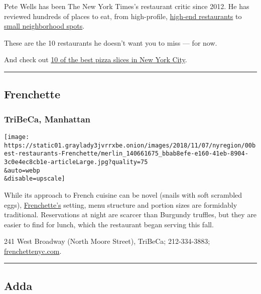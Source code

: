 Pete Wells has been The New York Times's restaurant critic since 2012.
He has reviewed hundreds of places to eat, from high-profile,
\href{https://www.nytimes3xbfgragh.onion/2018/10/09/dining/manhatta-restaurant-review.html}{high-end
restaurants} to
\href{https://www.nytimes3xbfgragh.onion/2018/10/02/dining/village-cafe-review-brooklyn.html}{small
neighborhood spots}.

These are the 10 restaurants he doesn't want you to miss --- for now.

And check out
\href{https://www.nytimes3xbfgragh.onion/2018/11/15/nyregion/best-pizza-slices-nyc.html}{10
of the best pizza slices in New York City}.

\begin{center}\rule{0.5\linewidth}{\linethickness}\end{center}

\hypertarget{frenchette}{%
\subsection{Frenchette}\label{frenchette}}

\hypertarget{tribeca-manhattan}{%
\subsubsection{TriBeCa, Manhattan}\label{tribeca-manhattan}}

\texttt{[image: https://static01.graylady3jvrrxbe.onion/images/2018/11/07/nyregion/00best-restaurants-Frenchette/merlin\_140661675\_bbab8efe-e160-41eb-8904-3c0e4ec8cb1e-articleLarge.jpg?quality=75\\\&auto=webp\\\&disable=upscale]}

While its approach to French cuisine can be novel (snails with soft
scrambled eggs),
\href{https://www.nytimes3xbfgragh.onion/2018/07/10/dining/frenchette-review-restaurant-tribeca.html}{Frenchette's}
setting, menu structure and portion sizes are formidably traditional.
Reservations at night are scarcer than Burgundy truffles, but they are
easier to find for lunch, which the restaurant began serving this fall.

241 West Broadway (North Moore Street), TriBeCa; 212-334-3883;
\href{https://www.frenchettenyc.com/}{frenchettenyc.com}.

\begin{center}\rule{0.5\linewidth}{\linethickness}\end{center}

\hypertarget{adda}{%
\subsection{Adda}\label{adda}}

